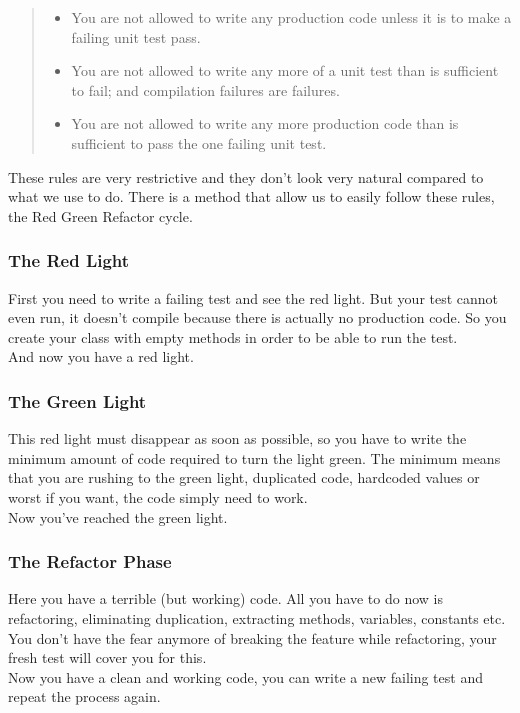 \begin{quote}
    \begin{itemize}
        \item You are not allowed to write any production code unless it is to
        make a failing unit test pass.
        \item You are not allowed to write any more of a unit test than is
        sufficient to fail;
        and compilation failures are failures.
        \item You are not allowed to write any more production code than is
        sufficient
        to pass the one failing unit test.
    \end{itemize}
\end{quote}

These rules are very restrictive and they don't look very natural
compared to what we use to do.
There is a method that allow us to easily follow these rules, the
Red Green Refactor cycle.

\subsubsection{The Red Light}
First you need to write a failing test and see the red light.
But your test cannot even run, it doesn't compile because there is
actually no production code.
So you create your class with empty methods in order to be able to run
the test. \\
And now you have a red light.

\subsubsection{The Green Light}
This red light must disappear as soon as possible, so you have to write
the minimum amount of code required to turn the light green.
The minimum means that you are rushing to the green light, duplicated
code, hardcoded values or worst if you want, the code simply need to
work. \\
Now you've reached the green light.

\subsubsection{The Refactor Phase}
Here you have a terrible (but working) code.
All you have to do now is refactoring, eliminating duplication,
extracting methods, variables, constants etc.
You don't have the fear anymore of breaking the feature while
refactoring, your fresh test will cover you for this. \\
Now you have a clean and working code, you can write a new failing test
and repeat the process again.

